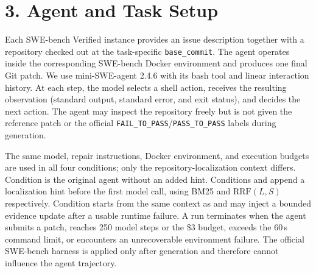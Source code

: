 \section*{3. Agent and Task Setup}

Each SWE-bench Verified instance provides an issue description together with a repository checked out at the task-specific \texttt{base\_commit}. The agent operates inside the corresponding SWE-bench Docker environment and produces one final Git patch. We use mini-SWE-agent 2.4.6 with its bash tool and linear interaction history. At each step, the model selects a shell action, receives the resulting observation (standard output, standard error, and exit status), and decides the next action. The agent may inspect the repository freely but is not given the reference patch or the official \texttt{FAIL\_TO\_PASS}/\texttt{PASS\_TO\_PASS} labels during generation.

The same model, repair instructions, Docker environment, and execution budgets are used in all four conditions; only the repository-localization context differs. Condition \condA{} is the original agent without an added hint. Conditions \condB{} and \condC{} append a localization hint before the first model call, using BM25 and $\mathrm{RRF}(L,S)$ respectively. Condition \condD{} starts from the same context as \condC{} and may inject a bounded evidence update after a usable runtime failure. A run terminates when the agent submits a patch, reaches 250 model steps or the \$3 budget, exceeds the 60\,s command limit, or encounters an unrecoverable environment failure. The official SWE-bench harness is applied only after generation and therefore cannot influence the agent trajectory.

